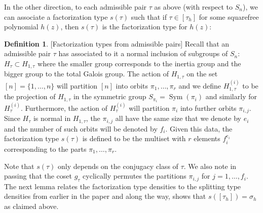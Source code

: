 \documentclass[10pt]{article}
\theoremstyle{plain}
\theoremstyle{definition}
\newtheorem{definition}[theorem]{Definition}
\numberwithin{equation}{section}
\begin{document}
In the other direction, to each admissible pair $\tau$ as above (with respect to $S_n$), we can associate a factorization type $s(\tau)$ such that if $\tau \in [\tau_h]$ for some squarefree polynomial $h(z)$, then $s(\tau)$ is the factorization type for $h(z)$:

\begin{definition}\label{defn: factorization types from admissible pairs}[Factorization types from admissible pairs]
Recall that an admissible pair $\tau$ has associated to it a normal inclusion of subgroups of $S_n$: $H_\tau \subset H_{1,\tau}$ where the smaller group corresponds to the inertia group and the bigger group to the total Galois group. The action of $H_{1,\tau}$ on the set $[n] = \{1,\dots,n\}$ will partition $[n]$ into orbits $\pi_1,\dots,\pi_r$ and we define $H_{1,\tau}^{(i)}$ to be the projection of $H_{1,\tau}$ in the symmetric group $S_{\pi_i} = \operatorname{Sym}(\pi_i)$ and similarly for $H_\tau^{(i)}$. Furthermore, the action of $H_{\tau}^{(i)}$ will partition $\pi_i$ into further orbits $\pi_{i,j}$. Since $H_\tau$ is normal in $H_{1,\tau}$, the $\pi_{i,j}$ all have the same size that we denote by $e_i$ and the number of such orbits will be denoted by $f_i$. Given this data, the factorization type $s(\tau)$ is defined to be the multiset with $r$ elements $f_i^{e_i}$ corresponding to the parts  $\pi_1,\dots,\pi_r$.
    
\end{definition}


Note that $s(\tau)$ only depends on the conjugacy class of $\tau$. We also note in passing that the coset $g_\tau$ cyclically permutes the partitions $\pi_{i,j}$ for $j=1,\dots,f_i$. The next lemma relates the factorization type densities to the splitting type densities from earlier in the paper and along the way, shows that $s([\tau_h]) = \sigma_h$ as claimed above.
\end{document}
